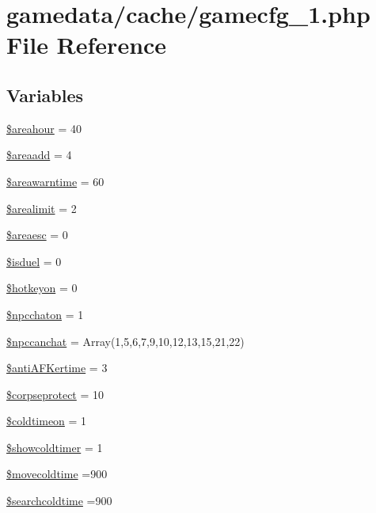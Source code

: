 \hypertarget{gamecfg__1_8php}{\section{gamedata/cache/gamecfg\+\_\+1.php File Reference}
\label{gamecfg__1_8php}
}
\subsection*{Variables}
\begin{DoxyCompactItemize}
\item 
\hyperlink{gamecfg__1_8php_a1828d2cbb2cd747c5cd48602b4ca09cb}{\$areahour} = 40
\item 
\hyperlink{gamecfg__1_8php_af943e9b276a7ecbe26aad99a4e0096b9}{\$areaadd} = 4
\item 
\hyperlink{gamecfg__1_8php_a045c9f101f315674842ecec326fd0c03}{\$areawarntime} = 60
\item 
\hyperlink{gamecfg__1_8php_ae95b2cf977f6bac24ace0c8e92cde4b3}{\$arealimit} = 2
\item 
\hyperlink{gamecfg__1_8php_aeadef6322f6931fcfe9d86637a36466f}{\$areaesc} = 0
\item 
\hyperlink{gamecfg__1_8php_a9e4e61c4d8c2ec483860269be77d4054}{\$isduel} = 0
\item 
\hyperlink{gamecfg__1_8php_a0e0ee5defa1b1d539fefe3204af96d1f}{\$hotkeyon} = 0
\item 
\hyperlink{gamecfg__1_8php_a2d8d4ed7ff8d195298498d2d1f57538a}{\$npcchaton} = 1
\item 
\hyperlink{gamecfg__1_8php_ac95e1ae6d28287b71f7f23c8b209c7f8}{\$npccanchat} = Array(1,5,6,7,9,10,12,13,15,21,22)
\item 
\hyperlink{gamecfg__1_8php_a87efbe85ad8248889a2017c77c47d518}{\$anti\+A\+F\+Kertime} = 3
\item 
\hyperlink{gamecfg__1_8php_a1564489dfe7ea743f668ddcf07a0ca6b}{\$corpseprotect} = 10
\item 
\hyperlink{gamecfg__1_8php_a673402e82c415b149cf5020f9890dd21}{\$coldtimeon} = 1
\item 
\hyperlink{gamecfg__1_8php_ae2bb65c1b1a88f0ea1745a4bb3872f76}{\$showcoldtimer} = 1
\item 
\hyperlink{gamecfg__1_8php_af659ed4a0b9dd7fd43f2319dfe0a7b67}{\$movecoldtime} =900
\item 
\hyperlink{gamecfg__1_8php_a0d7f09edddf8dab3c6dc096c0cfd0f6a}{\$searchcoldtime} =900
\item 

\end{DoxyCompactItemize}
